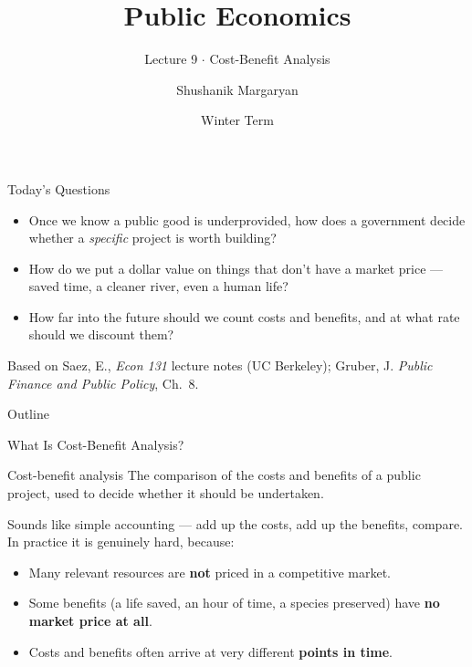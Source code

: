 \documentclass[11pt,aspectratio=169]{beamer}
\title{Public Economics}
\subtitle{Lecture 9 \(\cdot\) Cost-Benefit Analysis}
\author{Shushanik Margaryan}
\institute{WU Vienna University of Economics and Business}
\date{Winter Term}
\begin{document}
\begin{frame}
  \titlepage
\end{frame}

\begin{frame}{Today's Questions}
  \begin{itemize}
    \item Once we know a public good is underprovided, how does a government decide whether a \emph{specific} project is worth building?
    \item How do we put a dollar value on things that don't have a market price --- saved time, a cleaner river, even a human life?
    \item How far into the future should we count costs and benefits, and at what rate should we discount them?
  \end{itemize}
  \vspace{1em}
  \begin{block}{Based on}
    Saez, E., \emph{Econ 131} lecture notes (UC Berkeley); Gruber, J. \emph{Public Finance and Public Policy}, Ch.\ 8.
  \end{block}
\end{frame}

\begin{frame}{Outline}
  \tableofcontents
\end{frame}

\begin{frame}{What Is Cost-Benefit Analysis?}
  \begin{block}{Cost-benefit analysis}
    The comparison of the costs and benefits of a public project, used to decide whether it should be undertaken.
  \end{block}
  \vspace{0.5em}
  Sounds like simple accounting --- add up the costs, add up the benefits, compare. In practice it is genuinely hard, because:
  \begin{itemize}
    \item Many relevant resources are \textbf{not} priced in a competitive market.
    \item Some benefits (a life saved, an hour of time, a species preserved) have \textbf{no market price at all}.
    \item Costs and benefits often arrive at very different \textbf{points in time}.
  \end{itemize}
\end{frame}
\end{document}
